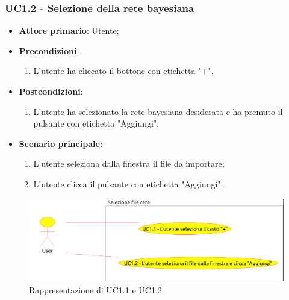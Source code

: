 \subsubsection{UC1.2 - Selezione della rete bayesiana}\label{UC1.2}
\begin{itemize}
	\item \textbf{Attore primario}: Utente;
	\item \textbf{Precondizioni}:
	\begin{enumerate}
		\item L'utente ha cliccato il bottone con etichetta "+".
	\end{enumerate}
	\item \textbf{Postcondizioni}: 
	\begin{enumerate}
		\item L'utente ha selezionato la rete bayesiana desiderata e ha premuto il pulsante con etichetta "Aggiungi".
	\end{enumerate}
	\item \textbf{Scenario principale:}
	\begin{enumerate}
		\item L'utente seleziona dalla finestra il file da importare;
		\item L'utente clicca il pulsante con etichetta "Aggiungi".
	\end{enumerate}
\end{itemize}

\begin{figure}[h!]
	\begin{center}
		\includegraphics[scale=0.5]{./images/subcaseUC1.png}
		 \caption{Rappresentazione di UC1.1 e UC1.2.}	
	\end{center}
\end{figure}

\pagebreak

